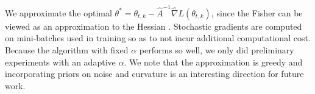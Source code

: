 We approximate the optimal $\theta^* = \theta_{t,k}  - \hat{A}^{-1} \hat{\nabla} L(\theta_{t,k})$, since the Fisher can be viewed as an approximation to the Hessian \cite{martens2014new}. Stochastic gradients are computed on mini-batches used in training so as to not incur additional computational cost.  Because the algorithm with fixed $\alpha$ performs so well, we only did preliminary experiments with an adaptive $\alpha$. We note that the approximation is greedy and incorporating priors on noise and curvature is an interesting direction for future work.